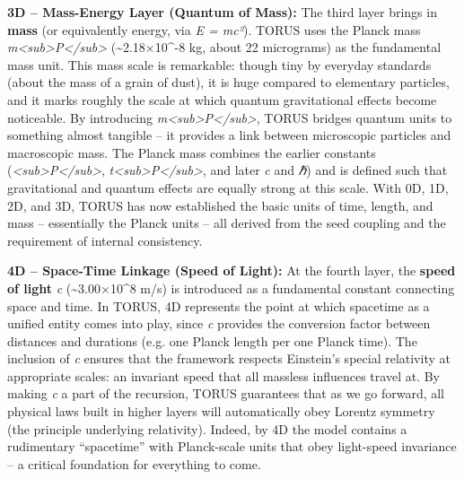 \documentclass[
]{article}
\begin{document}
\textbf{3D -- Mass-Energy Layer (Quantum of Mass):} The third layer
brings in \textbf{mass} (or equivalently energy, via \emph{E = mc²}).
TORUS uses the Planck mass
\emph{m\textless sub\textgreater P\textless/sub\textgreater{}}
(\textasciitilde2.18×10\^{}-8 kg, about 22 micrograms) as the
fundamental mass unit. This mass scale is remarkable: though tiny by
everyday standards (about the mass of a grain of dust), it is huge
compared to elementary particles, and it marks roughly the scale at
which quantum gravitational effects become noticeable. By introducing
\emph{m\textless sub\textgreater P\textless/sub\textgreater{}}, TORUS
bridges quantum units to something almost tangible -- it provides a link
between microscopic particles and macroscopic mass. The Planck mass
combines the earlier constants
(\emph{\ell\textless sub\textgreater P\textless/sub\textgreater{}},
\emph{t\textless sub\textgreater P\textless/sub\textgreater{}}, and
later \emph{c} and \emph{ℏ}) and is defined such that gravitational and
quantum effects are equally strong at this scale. With 0D, 1D, 2D, and
3D, TORUS has now established the basic units of time, length, and mass
-- essentially the Planck units -- all derived from the seed coupling
and the requirement of internal consistency.

\textbf{4D -- Space-Time Linkage (Speed of Light):} At the fourth layer,
the \textbf{speed of light} \emph{c} (\textasciitilde3.00×10\^{}8 m/s)
is introduced as a fundamental constant connecting space and time. In
TORUS, 4D represents the point at which spacetime as a unified entity
comes into play, since \emph{c} provides the conversion factor between
distances and durations (e.g. one Planck length per one Planck time).
The inclusion of \emph{c} ensures that the framework respects Einstein's
special relativity at appropriate scales: an invariant speed that all
massless influences travel at. By making \emph{c} a part of the
recursion, TORUS guarantees that as we go forward, all physical laws
built in higher layers will automatically obey Lorentz symmetry (the
principle underlying relativity). Indeed, by 4D the model contains a
rudimentary ``spacetime'' with Planck-scale units that obey light-speed
invariance -- a critical foundation for everything to come.
\end{document}
